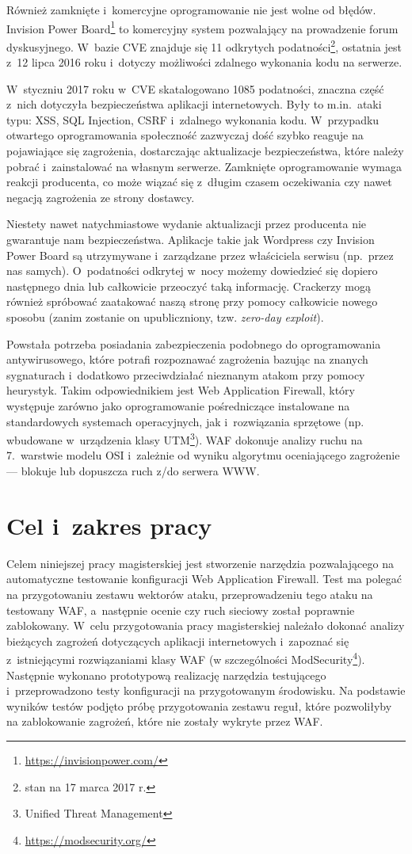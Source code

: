 \documentclass[12pt,a4paper,polish,thesis]{dcsbook}
\begin{document}
Również zamknięte i~komercyjne oprogramowanie nie jest wolne od błędów. Invision Power Board\footnote{\url{https://invisionpower.com/}} to komercyjny system pozwalający na prowadzenie forum dyskusyjnego. W~bazie CVE znajduje się 11 odkrytych podatności\footnote{stan na 17 marca 2017 r.}, ostatnia jest z~12 lipca 2016 roku i~dotyczy możliwości zdalnego wykonania kodu na serwerze.

 W~styczniu 2017 roku w~CVE skatalogowano 1085 podatności, znaczna część z~nich dotyczyła bezpieczeństwa aplikacji internetowych. Były to m.in.\ ataki typu: XSS, SQL Injection, CSRF i~zdalnego wykonania kodu. W~przypadku otwartego oprogramowania społeczność zazwyczaj dość szybko reaguje na pojawiające się zagrożenia, dostarczając aktualizacje bezpieczeństwa, które należy pobrać i~zainstalować na własnym serwerze. Zamknięte oprogramowanie wymaga reakcji producenta, co może wiązać się z~długim czasem oczekiwania czy nawet negacją zagrożenia ze strony dostawcy.

Niestety nawet natychmiastowe wydanie aktualizacji przez producenta nie gwarantuje nam bezpieczeństwa. Aplikacje takie jak Wordpress czy Invision Power Board są utrzymywane i~zarządzane przez właściciela serwisu (np.\ przez nas samych). O~podatności odkrytej w~nocy możemy dowiedzieć się dopiero następnego dnia lub całkowicie przeoczyć taką informację. Crackerzy mogą również spróbować zaatakować naszą stronę przy pomocy całkowicie nowego sposobu (zanim zostanie on upubliczniony, tzw. \textit{zero-day exploit}).

Powstała potrzeba posiadania zabezpieczenia podobnego do oprogramowania antywirusowego, które potrafi rozpoznawać zagrożenia bazując na znanych sygnaturach i~dodatkowo przeciwdziałać nieznanym atakom przy pomocy heurystyk. Takim odpowiednikiem jest Web Application Firewall, który występuje zarówno jako oprogramowanie pośredniczące instalowane na standardowych systemach operacyjnych, jak i~rozwiązania sprzętowe (np. wbudowane w~urządzenia klasy UTM\footnote{Unified Threat Management}). WAF dokonuje analizy ruchu na 7.~warstwie modelu OSI i~zależnie od wyniku algorytmu oceniającego zagrożenie --- blokuje lub dopuszcza ruch z/do serwera WWW.  

\section*{Cel i~zakres pracy}
Celem niniejszej pracy magisterskiej jest stworzenie narzędzia pozwalającego na automatyczne testowanie konfiguracji Web Application Firewall. Test ma polegać na przygotowaniu zestawu wektorów ataku, przeprowadzeniu tego ataku na testowany WAF, a~następnie ocenie czy ruch sieciowy został poprawnie zablokowany. W~celu przygotowania pracy magisterskiej należało dokonać analizy bieżących zagrożeń dotyczących aplikacji internetowych i~zapoznać się z~istniejącymi rozwiązaniami klasy WAF (w szczególności ModSecurity\footnote{\url{https://modsecurity.org/}}). Następnie wykonano prototypową realizację narzędzia testującego i~przeprowadzono testy konfiguracji na przygotowanym środowisku. Na podstawie wyników testów podjęto próbę przygotowania zestawu reguł, które pozwoliłyby na zablokowanie zagrożeń, które nie zostały wykryte przez WAF.
\end{document}
